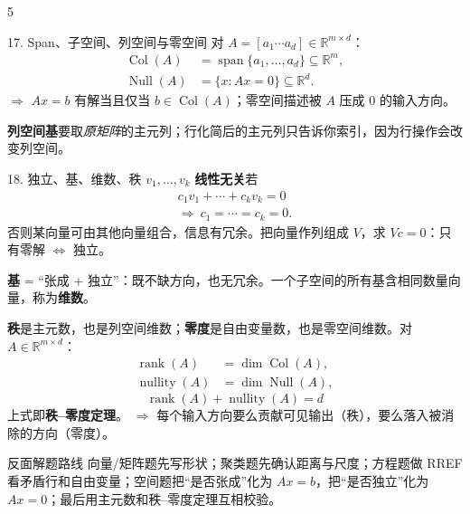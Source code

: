 \documentclass[a4paper,landscape,fontset=fandol]{ctexart}
\newcommand{\term}[1]{\textbf{\color{teal!80!black}#1}}
\newcommand{\warn}[1]{\textbf{\color{red}#1}}
\newcommand{\sense}[1]{\textcolor{muted}{\ensuremath{\Rightarrow} #1}}
\newcommand{\R}{\mathbb{R}}
\newcommand{\rank}{\operatorname{rank}}
\newcommand{\nullity}{\operatorname{nullity}}
\newcommand{\Span}{\operatorname{span}}
\begin{document}
\begin{multicols*}{5}
\begin{boxx}{17. Span、子空间、列空间与零空间}
对 $A=[a_1\cdots a_d]\in\R^{m\times d}$：
\[
\begin{aligned}
\operatorname{Col}(A)&=\Span\{a_1,\ldots,a_d\}\subseteq\R^m,\\
\operatorname{Null}(A)&=\{x:Ax=0\}\subseteq\R^d.
\end{aligned}
\]
\sense{$Ax=b$ 有解当且仅当 $b\in\operatorname{Col}(A)$；零空间描述被 $A$ 压成 0 的输入方向。}

\warn{列空间基}要取\emph{原矩阵}的主元列；行化简后的主元列只告诉你索引，因为行操作会改变列空间。
\end{boxx}

\columnbreak

\begin{boxx}{18. 独立、基、维数、秩}
$v_1,\ldots,v_k$ \term{线性无关}若
\[
\begin{gathered}
c_1v_1+\cdots+c_kv_k=0\\ \Rightarrow\ c_1=\cdots=c_k=0.
\end{gathered}
\]
否则某向量可由其他向量组合，信息有冗余。把向量作列组成 $V$，求 $V c=0$：只有零解 $\Leftrightarrow$ 独立。

\term{基} = “张成 + 独立”：既不缺方向，也无冗余。一个子空间的所有基含相同数量向量，称为\term{维数}。

\term{秩}是主元数，也是列空间维数；\term{零度}是自由变量数，也是零空间维数。对 $A\in\R^{m\times d}$：
\[
\begin{aligned}
\rank(A)&=\dim\operatorname{Col}(A),\\
\nullity(A)&=\dim\operatorname{Null}(A),
\end{aligned}
\]
\[
\boxed{\rank(A)+\nullity(A)=d}
\]
上式即\term{秩--零度定理}。
\sense{每个输入方向要么贡献可见输出（秩），要么落入被消除的方向（零度）。}
\end{boxx}

\begin{keybox}{反面解题路线}
向量/矩阵题先写形状；聚类题先确认距离与尺度；方程题做 RREF 看矛盾行和自由变量；空间题把“是否张成”化为 $Ax=b$，把“是否独立”化为 $Ax=0$；最后用主元数和秩--零度定理互相校验。
\end{keybox}

\end{multicols*}
\end{document}
